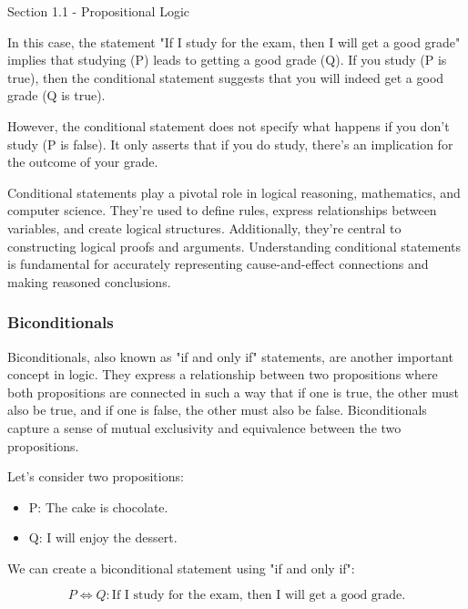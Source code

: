 \begin{notes}{Section 1.1 - Propositional Logic}
\begin{highlight}
        In this case, the statement "If I study for the exam, then I will get a good grade" implies that studying (P) leads to getting a good grade (Q). If you study (P is true), then the conditional statement suggests 
        that you will indeed get a good grade (Q is true).

        However, the conditional statement does not specify what happens if you don't study (P is false). It only asserts that if you do study, there's an implication for the outcome of your grade.
    \end{highlight}

    Conditional statements play a pivotal role in logical reasoning, mathematics, and computer science. They're used to define rules, express relationships between variables, and create logical structures. Additionally, 
    they're central to constructing logical proofs and arguments. Understanding conditional statements is fundamental for accurately representing cause-and-effect connections and making reasoned conclusions.

    \subsubsection*{Biconditionals}

    Biconditionals, also known as "if and only if" statements, are another important concept in logic. They express a relationship between two propositions where both propositions are connected in such a way that if one is 
    true, the other must also be true, and if one is false, the other must also be false. Biconditionals capture a sense of mutual exclusivity and equivalence between the two propositions.

    \begin{highlight}
        Let's consider two propositions:

        \begin{itemize}
            \item P: The cake is chocolate.
            \item Q: I will enjoy the dessert.
        \end{itemize}

        We can create a biconditional statement using "if and only if":

        \begin{equation}
            P \Leftrightarrow Q: \text{If I study for the exam, then I will get a good grade.}
        \end{equation}


\end{highlight}
\end{notes}
